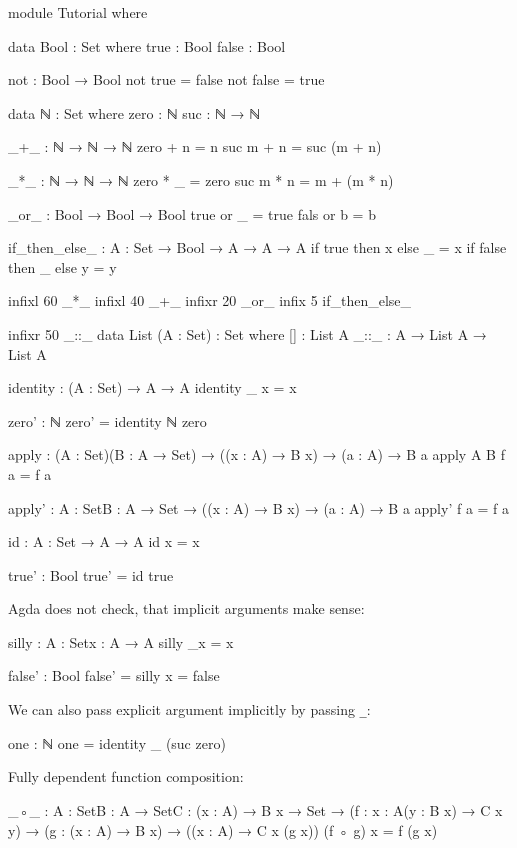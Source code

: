 \begin{code}
module Tutorial where

data Bool : Set where
  true : Bool
  false : Bool

not : Bool → Bool
not true = false
not false = true

data ℕ : Set where
  zero : ℕ
  suc : ℕ → ℕ

_+_ : ℕ → ℕ → ℕ
zero + n = n
suc m + n = suc (m + n)

_*_ : ℕ → ℕ → ℕ
zero * _ = zero
suc m * n = m + (m * n)

_or_ : Bool → Bool → Bool
true or _ = true
fals or b = b

if_then_else_ : {A : Set} → Bool → A → A → A
if true then x else _ = x
if false then _ else y = y

infixl 60 _*_
infixl 40 _+_
infixr 20 _or_
infix 5 if_then_else_

infixr 50 _::_
data List (A : Set) : Set where
  [] : List A
  _::_ : A → List A → List A

identity : (A : Set) → A → A
identity _ x = x

zero' : ℕ
zero' = identity ℕ zero

apply : (A : Set)(B : A → Set) → ((x : A) → B x) → (a : A) → B a
apply A B f a = f a

apply' : {A : Set}{B : A → Set} → ((x : A) → B x) → (a : A) → B a
apply' f a = f a

id : {A : Set} → A → A
id x = x

true' : Bool
true' = id true
\end{code}

Agda does not check, that implicit arguments make sense:
\begin{code}
silly : {A : Set}{x : A} → A
silly {_}{x} = x

false' : Bool
false' = silly {x = false}
\end{code}

We can also pass explicit argument implicitly by passing \verb+_+:
\begin{code}
one : ℕ
one = identity _ (suc zero)
\end{code}

Fully dependent function composition:
\begin{code}
_◦_ : {A : Set}{B : A → Set}{C : (x : A) → B x → Set}
  → (f : {x : A}(y : B x) → C x y)
  → (g : (x : A) → B x)
  → ((x : A) → C x (g x))
(f ◦ g) x = f (g x)
\end{code}

